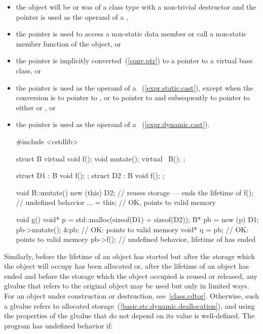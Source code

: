 \begin{itemize}
\item the object will be or was of a class type with a non-trivial destructor
and the pointer is used as the operand of a ,

\item the pointer is used to access a non-static data member or call a
non-static member function of the object, or

\item the pointer is implicitly converted~(\ref{conv.ptr}) to a pointer
to a virtual base class, or

\item the pointer is used as the operand of a
~(\ref{expr.static.cast}), except when the conversion
is to pointer to  , or to pointer to 
 and subsequently to pointer to either 
 or  , or

\item the pointer is used as the operand of a
~(\ref{expr.dynamic.cast}). \enterexample

\begin{codeblock}
#include <cstdlib>

struct B {
  virtual void f();
  void mutate();
  virtual ~B();
};

struct D1 : B { void f(); };
struct D2 : B { void f(); };

void B::mutate() {
  new (this) D2;    // reuses storage --- ends the lifetime of 
  f();              // undefined behavior
  ... = this;       // OK,  points to valid memory
}

void g() {
  void* p = std::malloc(sizeof(D1) + sizeof(D2));
  B* pb = new (p) D1;
  pb->mutate();
  &pb;              // OK:  points to valid memory
  void* q = pb;     // OK:  points to valid memory
  pb->f();          // undefined behavior, lifetime of  has ended
}
\end{codeblock}
\exitexample
\end{itemize}

\pnum
Similarly, before the lifetime of an object has started but after the
storage which the object will occupy has been allocated or, after the
lifetime of an object has ended and before the storage which the object
occupied is reused or released, any glvalue that refers to the original
object may be used but only in limited ways.
For an object under construction or destruction, see~\ref{class.cdtor}.
Otherwise, such
a glvalue refers to
allocated storage~(\ref{basic.stc.dynamic.deallocation}), and using the
properties of the glvalue that do not depend on its value is
well-defined. The program has undefined behavior if:

